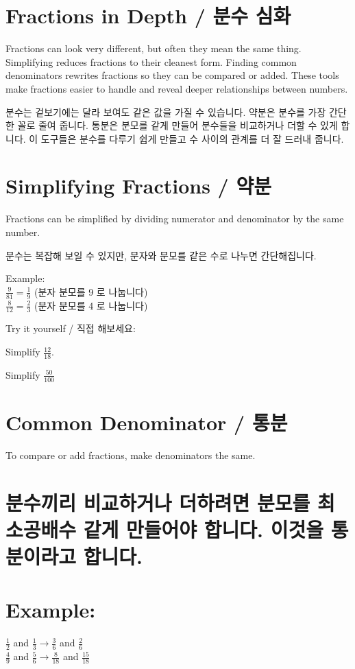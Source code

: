 \documentclass[10pt]{article}
\begin{document}
\section*{Fractions in Depth / 분수 심화}
Fractions can look very different, but often they mean the same thing. Simplifying reduces fractions to their cleanest form. Finding common denominators rewrites fractions so they can be compared or added. These tools make fractions easier to handle and reveal deeper relationships between numbers.

분수는 겉보기에는 달라 보여도 같은 값을 가질 수 있습니다. 약분은 분수를 가장 간단한 꼴로 줄여 줍니다. 통분은 분모를 같게 만들어 분수들을 비교하거나 더할 수 있게 합니다. 이 도구들은 분수를 다루기 쉽게 만들고 수 사이의 관계를 더 잘 드러내 줍니다.

\section*{Simplifying Fractions / 약분}
Fractions can be simplified by dividing numerator and denominator by the same number.

분수는 복잡해 보일 수 있지만, 분자와 분모를 같은 수로 나누면 간단해집니다.

Example:\\
$\frac{9}{81}=\frac{1}{9}$ (분자 분모를 9 로 나눕니다)\\
$\frac{8}{12}=\frac{2}{3}$ (분자 분모를 4 로 나눕니다)

Try it yourself / 직접 해보세요:

Simplify $\frac{12}{18}$.

Simplify $\frac{50}{100}$

\section*{Common Denominator / 통분}
To compare or add fractions, make denominators the same.

\section*{분수끼리 비교하거나 더하려면 분모를 최소공배수 같게 만들어야 합니다. 이것을 통분이라고 합니다.}
\section*{Example:}
$\frac{1}{2}$ and $\frac{1}{3} \rightarrow \frac{3}{6}$ and $\frac{2}{6}$\\
$\frac{4}{9}$ and $\frac{5}{6} \rightarrow \frac{8}{18}$ and $\frac{15}{18}$
\end{document}
